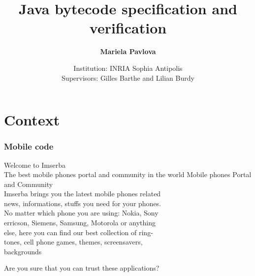 \documentclass{beamer}
\title[]{Java bytecode specification and verification}
\author[mariela.pavlova@sophia.inria.fr]{\textbf{Mariela Pavlova}}
\date[INRIA Sophia Antipolis ]{Institution: INRIA Sophia Antipolis\\
Supervisors: Gilles Barthe and Lilian Burdy}
\begin{document}
\begin{frame}
\titlepage
\end{frame}





\newcommand{\wpi}{\mbox{\rm\textit{wp}}}%
\newcommand{\Pred}{\mbox{\rm\texttt{Pred}}}
\newcommand{\program}{\mbox{\rm\texttt{P}}}%
\newcommand{\Method}{\mbox{\rm\texttt{Method}}}%
\newcommand{\methodd}{\mbox{\rm\textit{m}}}

%    



\section{Context}
\begin{frame}[shrink]
\frametitle{Mobile code}
Welcome to Imserba\bigskip\\

The best mobile phones portal and community in the world
Mobile phones Portal and Community\bigskip\\  

Imserba brings you the latest mobile phones related \\
news, informations, stuffs you need for your phones. \\
No matter which phone you are using: Nokia, Sony\\
erricson, Siemens, Samsung, Motorola or anything\\ 
else, here you can find our best collection of ring- \\
tones, cell phone games, themes, screensavers,\\
backgrounds
\begin{center}
\end{center}    
\alert{Are you sure that you can trust these applications?} 
\end{frame}
\end{document}
